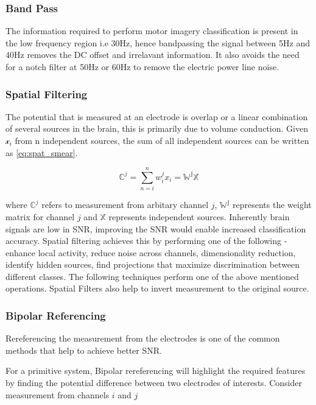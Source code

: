 \subsubsection{Band Pass}
The information required to perform motor imagery classification is present in the low frequency region i.e 30Hz, hence bandpassing the signal between 5Hz and 40Hz removes the DC 
offset and irrelavant information. It also avoids the need for a notch filter at 50Hz or 60Hz to remove the electric power line noise. 

\subsubsection{Spatial Filtering}
The potential that is measured at an electrode is overlap or a linear combination of several sources in the brain, this is primarily due to volume conduction. Given $\mathcal{x}_i$
from n independent sources, the sum of all independent sources can be written as \ref{eq:spat_smear}.

\begin{equation} \label{eq:spat_smear}
    \mathbb{C}^{j} = \sum_{n = i}^{n} w_{i}^{j} x_{i} = \mathbb{W^{j} X} 
\end{equation}

where $\mathbb{C}^{j} $ refers to measurement from arbitary channel $j$,  $\mathbb{W^j}$ represents the weight matrix for channel $j$ and $\mathbb{X}$ represents independent sources.
Inherently brain signals are low in SNR, improving the SNR would enable increased classification accuracy. Spatial filtering achieves this by performing one of the following 
- enhance local activity, reduce noise across channels, dimensionality reduction, identify hidden sources, find projections that maximize
discrimination between different classes. The following techniques perform one of the above mentioned operations. Spatial Filters also help to invert measurement to the
original source.

\subsubsection{Bipolar Referencing}
Rereferencing the measurement from the electrodes is one of the common methods that help to achieve better SNR.

For a primitive system, Bipolar rereferencing will highlight the required features by finding the potential difference between two electrodes of interests. Consider measurement from 
channels $i$ and $j$


